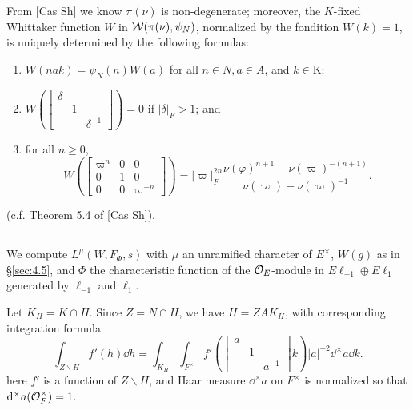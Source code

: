 From [Cas Sh] we know $\pi(\nu)$ is non-degenerate; moreover, the $K$-fixed Whittaker function $W$ in $\mathcal{W}(\pi(\nu), \psi_N)$, normalized by the fondition $W(k) =1$, is uniquely determined by the following formulas:
\begin{enumerate}[label=(\roman*)]
    \item $W(nak) = \psi_N(n) W(a)$ for all $n \in N, a \in A$, and $k \in $K;
    \item $W\left(\left[\begin{smallmatrix}
        \delta & & \\ & 1&  \\ & & \delta^{-1}
    \end{smallmatrix}\right]\right) = 0$ if $|\delta|_F > 1$; and
    \item for all $n \geq 0$,
    \[
        W\left(\begin{bmatrix}
            \varpi^{n} & 0 & 0 \\ 0 & 1 & 0 \\ 0 & 0 & \varpi^{-n}
        \end{bmatrix}\right) = |\varpi|_F^{2n} \frac{\nu(\varphi)^{n+1} - \nu(\varpi)^{-(n+1)}}{\nu(\varpi) - \nu(\varpi)^{-1}}.
    \]
\end{enumerate}
(c.f. Theorem 5.4 of [Cas Sh]).


\subsection{}
\label{sec:4.6}


We compute $L^\mu(W, F_\Phi, s)$ with $\mu$ an unramified character of $E^\times$, $W(g)$ as in \S \ref{sec:4.5}, and $\Phi$ the characteristic function of the $\mathcal{O}_E$-module in $E\ell_{-1} \oplus E\ell_{1}$ generated by $\ell_{-1}$ and $\ell_{1}$.

Let $K_H = K \cap H$. Since $Z = N \cap H$, we have $H = ZAK_H$, with corresponding integration formula
\[
    \int_{Z\backslash H} f'(h) \dd h = \int_{K_H} \int_{F^\times} f'\left(\begin{bmatrix}
        a & & \\ & 1 & \\ & & a^{-1}       
    \end{bmatrix}k\right) |a|^{-2} \dd^\times a \dd k.
\]
here $f'$ is a function of $Z\backslash H$, and Haar measure $\dd^\times a$ on $F^\times$ is normalized so that $\mathrm{d}^\times a(\mathcal{O}_F^\times)= 1$.


